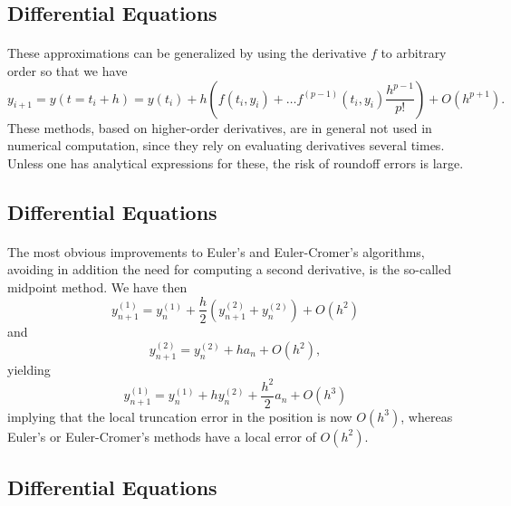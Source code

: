 \documentclass[%
oneside,                 %
final,                   %
10pt]{article}
\begin{document}
\subsection*{Differential Equations}

\paragraph{}
These approximations can be generalized by using the derivative $f$ to
arbitrary order so that we have
\begin{equation}
     y_{i+1}=y(t=t_i+h)=y(t_i) + h(f(t_i,y_i)+\dots f^{(p-1)}(t_i,y_i)
     \frac{h^{p-1}}{p!}) + O(h^{p+1}).
\end{equation}
These methods, based on higher-order derivatives, are in general not used
in numerical computation, since they rely on evaluating 
derivatives several times. Unless one has analytical expressions
for these, the risk of roundoff errors is large.



\subsection*{Differential Equations}

\paragraph{}
The most obvious improvements to Euler's and Euler-Cromer's algorithms, 
avoiding in addition the need for computing a
second derivative, is the so-called midpoint method. We have then
\begin{equation} 
   y^{(1)}_{n+1}=y^{(1)}_{n}+\frac{h}{2}\left(y^{(2)}_{n+1}+y^{(2)}_{n}\right)+O(h^2)
\end{equation}
and 
\begin{equation}
   y^{(2)}_{n+1}=y^{(2)}_{n}+h a_{n}+O(h^2),
\end{equation}
yielding
\begin{equation} 
   y^{(1)}_{n+1}=y^{(1)}_{n}+hy^{(2)}_{n}+\frac{h^2}{2}a_n+O(h^3)
\end{equation}
implying that the local truncation error in the position is now $O(h^3)$, whereas Euler's or Euler-Cromer's
methods have a local error of  $O(h^2)$.



\subsection*{Differential Equations}
\end{document}
